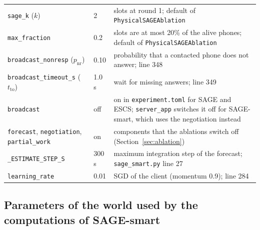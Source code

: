\documentclass[11pt,a4paper]{article}
\newcommand{\cf}[1]{\texttt{#1}}
\begin{document}
\begin{longtable}{p{}p{}p{}}
\cf{sage\_k} ($k$) & 2 & slots at round 1; default of \cf{PhysicalSAGEAblation} \\
\cf{max\_fraction} & 0.2 & slots are at most 20\% of the alive phones; default of \cf{PhysicalSAGEAblation} \\
\cf{broadcast\_nonresp} ($p_{\mathrm{nr}}$) & 0.10 & probability that a contacted phone does not answer; line 348 \\
\cf{broadcast\_timeout\_s} ($t_{\mathrm{to}}$) & 1.0 s & wait for missing answers; line 349 \\
\cf{broadcast} & off & on in \cf{experiment.toml} for SAGE and ESCS; \cf{server\_app} switches it off for SAGE-smart, which uses the negotiation instead \\
\cf{forecast}, \cf{negotiation}, \cf{partial\_work} & on & components that the ablations switch off (Section~\ref{sec:ablation}) \\
\cf{\_ESTIMATE\_STEP\_S} & 300 s & maximum integration step of the forecast; \cf{sage\_smart.py} line 27 \\
\cf{learning\_rate} & 0.01 & SGD of the client (momentum 0.9); line 284 \\
\bottomrule
\end{longtable}

\subsection{Parameters of the world used by the computations of SAGE-smart}
\end{document}
